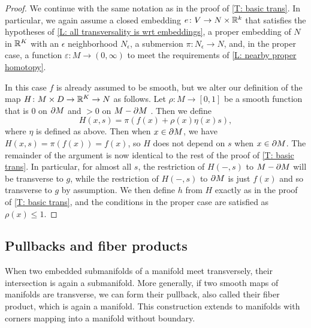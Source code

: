 \begin{proof}
	We continue with the same notation as in the proof of \cref{T: basic trans}.
	In particular, we again assume a closed embedding $e \colon V \to N \times \mathbb{R}^k$ that satisfies the hypotheses of \cref{L: all transversality is wrt embeddings}, a proper embedding of $N$ in $\mathbb{R}^K$ with an $\epsilon$ neighborhood $N_\epsilon$, a submersion $\pi \colon N_\epsilon \to N$, and, in the proper case, a function $\varepsilon \colon M \to (0,\infty)$ to meet the requirements of \cref{L: nearby proper homotopy}.

	In this case $f$ is already assumed to be smooth, but we alter our definition of the map $H \colon M \times D \to \mathbb{R}^K \to N$ as follows.
	Let $\rho \colon M \to [0,1]$ be a smooth function that is $0$ on $\partial M$ and $>0$ on $M-\partial M$ \cite[Proposition 5.43]{Lee13}.
	Then we define
	$$H(x,s) = \pi(f(x)+ \rho(x)\eta(x)s),$$
	where $\eta$ is defined as above.
	Then when $x \in \partial M$, we have $H(x,s) = \pi(f(x)) = f(x)$, so $H$ does not depend on $s$ when $x \in \partial M$.
	The remainder of the argument is now identical to the rest of the proof of \cref{T: basic trans}.
	In particular, for almost all $s$, the restriction of $H(-,s)$ to $M - \partial M$ will be transverse to $g$, while the restriction of $H(-,s)$ to $\partial M$ is just $f(x)$ and so transverse to $g$ by assumption.
	We then define $h$ from $H$ exactly as in the proof of \cref{T: basic trans}, and the conditions in the proper case are satisfied as $\rho(x)\leq 1$.
\end{proof}

\subsection{Pullbacks and fiber products}

When two embedded submanifolds of a manifold meet transversely, their intersection is again a submanifold.
More generally, if two smooth maps of manifolds are transverse, we can form their pullback, also called their fiber product, which is again a manifold.
This construction extends to manifolds with corners mapping into a manifold without boundary.


